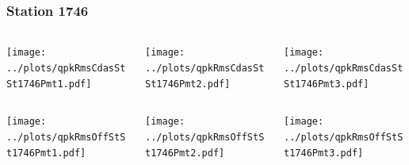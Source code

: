 \documentclass[aspectratio=169]{beamer}
\begin{document}
\begin{frame} 
  \frametitle{Station 1746}
  \begin{center}
    \begin{columns}
      \begin{column}{0.33\textwidth}
        \texttt{[image: ../plots/qpkRmsCdasStSt1746Pmt1.pdf]}
      \end{column}
      \begin{column}{0.33\textwidth}
        \texttt{[image: ../plots/qpkRmsCdasStSt1746Pmt2.pdf]}
      \end{column}
      \begin{column}{0.33\textwidth}
        \texttt{[image: ../plots/qpkRmsCdasStSt1746Pmt3.pdf]}
      \end{column}
    \end{columns}
  \end{center}

  \begin{center}
    \begin{columns}
      \begin{column}{0.33\textwidth}
        \texttt{[image: ../plots/qpkRmsOffStSt1746Pmt1.pdf]}
      \end{column}
      \begin{column}{0.33\textwidth}
        \texttt{[image: ../plots/qpkRmsOffStSt1746Pmt2.pdf]}
      \end{column}
      \begin{column}{0.33\textwidth}
        \texttt{[image: ../plots/qpkRmsOffStSt1746Pmt3.pdf]}
      \end{column}
    \end{columns}
  \end{center}
\end{frame}
\end{document}
